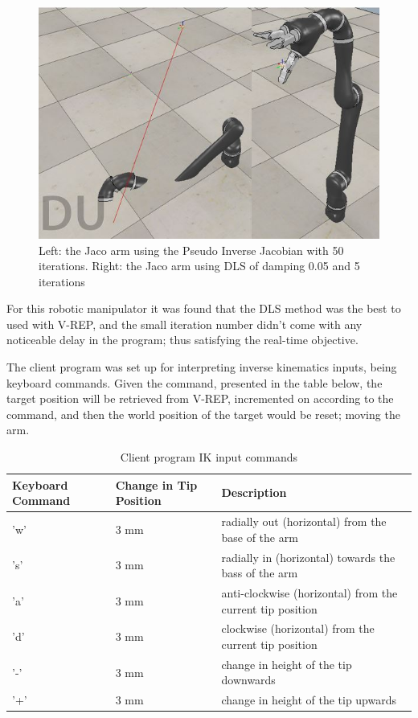 \documentclass[12pt,openany,a4paper]{book}
\begin{document}
\begin{center}
\begin{figure}[htb]
  \includegraphics[width=0.9\linewidth]{Small_change_jaco_result.jpg}
\caption{Left: the Jaco arm using the Pseudo Inverse Jacobian with 50 iterations. Right: the Jaco arm using DLS of damping 0.05 and 5 iterations}
\end{figure}
\end{center}


For this robotic manipulator it was found that the DLS method was the best to used with V-REP, and the small iteration number didn't come with any noticeable delay in the program; thus satisfying the real-time objective.

The client program was set up for interpreting inverse kinematics inputs, being keyboard commands. Given the command, presented in the table below, the target position will be retrieved from V-REP, incremented on according to the command, and then the world position of the target would be reset; moving the arm.

\begin{center}
\begin{table}[htb]

    \begin{tabular}{| l | l | p{6cm} |}
     \hline
     Keyboard Command & Change in Tip Position & Description  \\ 
     \hline
     'w' & 3 mm & radially out (horizontal) from the base of the arm \\ 
     \hline
     's' & 3 mm & radially in (horizontal) towards the bass of the arm \\ 
     \hline
     'a' & 3 mm & anti-clockwise (horizontal) from the current tip position \\ 				 \hline
     'd' & 3 mm & clockwise (horizontal) from the current tip position \\ 
     \hline
     '-' & 3 mm & change in height of the tip downwards \\ 
     \hline
     '+' & 3 mm & change in height of the tip upwards \\ 
     \hline
    \end{tabular}
    \caption{Client program IK input commands}
\end{table}
\end{center}
\end{document}
